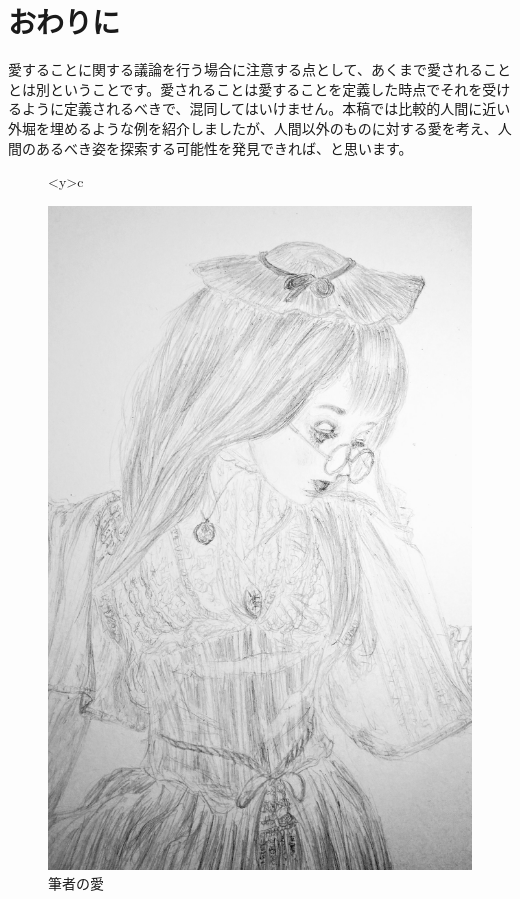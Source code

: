 \documentclass[b5j,twoside,twocolumn]{utarticle}
\begin{document}
\section*{おわりに}
愛することに関する議論を行う場合に注意する点として、あくまで愛されることとは別ということです。愛されることは愛することを定義した時点でそれを受けるように定義されるべきで、混同してはいけません。本稿では比較的人間に近い外堀を埋めるような例を紹介しましたが、人間以外のものに対する愛を考え、人間のあるべき姿を探索する可能性を発見できれば、と思います。
\begin{figure}[h]
\centering
\begin{tabular}<y>{c}
\begin{minipage}[c]{0.8\hsize}
\centering
\includegraphics[scale=0.22]{n3I9SWuM}
\caption{筆者の愛}
\end{minipage}
\end{tabular}
\end{figure}
\end{document}
